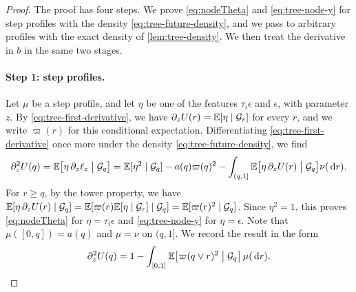 \begin{proof}
The proof has four steps. We prove \eqref{eq:nodeTheta} and
\eqref{eq:tree-node-y} for step profiles with the density
\eqref{eq:tree-future-density}, and we pass to arbitrary profiles with
the exact density of \cref{lem:tree-density}. We then treat the
derivative in $b$ in the same two stages.

\paragraph{Step 1: step profiles.}
Let $\mu$ be a step profile, and let $\eta$ be one of the features
$\tau_i\epsilon$ and $\epsilon$, with parameter $z$. By
\eqref{eq:tree-first-derivative}, we have
$\partial_zU(r)=\mathbb E[\eta\mid\mathcal G_r]$ for every $r$, and we write
$\varpi(r)$ for this conditional expectation. Differentiating
\eqref{eq:tree-first-derivative} once more under the density
\eqref{eq:tree-future-density}, we find
\[
 \partial_z^2U(q)=\mathbb E\bigl[\eta\,\partial_z\ell_z\bigm|\mathcal G_q\bigr]
 =\mathbb E[\eta^2\mid\mathcal G_q]-a(q)\varpi(q)^2
   -\int_{(q,1]}\mathbb E\bigl[\eta\,\partial_zU(r)\bigm|\mathcal G_q\bigr]\nu(\,\mathrm d r).
\]
For $r\ge q$, by the tower property, we have
$\mathbb E[\eta\,\partial_zU(r)\mid\mathcal G_q]=\mathbb E[\varpi(r)\mathbb E[\eta\mid\mathcal G_r]\mid\mathcal G_q]
=\mathbb E[\varpi(r)^2\mid\mathcal G_q]$. Since $\eta^2=1$, this proves
\eqref{eq:nodeTheta} for $\eta=\tau_i\epsilon$ and
\eqref{eq:tree-node-y} for $\eta=\epsilon$. Note that $\mu([0,q])=a(q)$
and $\mu=\nu$ on $(q,1]$. We record the result in the form
\begin{equation}\label{eq:tree-atom-safe}
 \partial_z^2U(q)=1-\int_{[0,1]}\mathbb E\bigl[\varpi(q\vee r)^2\bigm|\mathcal G_q\bigr]
   \,\mu(\,\mathrm d r).
\end{equation}


\end{proof}

